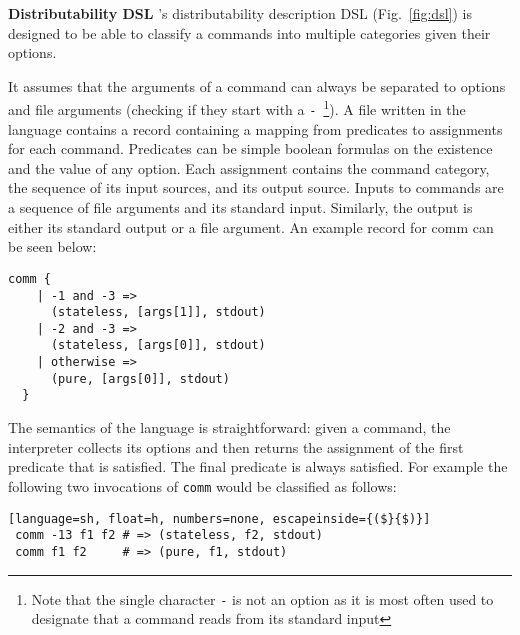 \documentclass[sigplan,10pt,review,anonymous]{acmart}
\newcommand{\heading}[1]{\vspace{4pt}\noindent\textbf{#1}\enspace}
\newcommand{\ttt}[1]{\texttt{\small #1}}
\newcommand{\cn}[1]{\mbox{\textcircled{\footnotesize #1}}}
\newcommand{\pur}{\cn{\textsc{P}}\xspace}
\newcommand{\sta}{\cn{\textsc{S}}\xspace}
\newcommand{\tr}[1]{} %
\begin{document}

\heading{Distributability DSL}
%
\sys's distributability description DSL (Fig.~\ref{fig:dsl}) is
designed to be able to classify a commands into multiple categories
given their options.

It assumes that the arguments of a command can always be separated to
options and file arguments (checking if they start with a
\ttt{-}~\footnote{Note that the single character \ttt{-} is not an
  option as it is most often used to designate that a command reads
  from its standard input}). A file written in the language contains a
record containing a mapping from predicates to assignments for each
command. Predicates can be simple boolean formulas on the existence
and the value of any option. Each assignment contains the command
category, the sequence of its input sources, and its output
source. Inputs to commands are a sequence of file arguments and its
standard input. Similarly, the output is either its standard output or
a file argument. An example record for comm can be seen below:

\begin{lstlisting}[float=h, numbers=none]
  comm {
    | -1 and -3 =>
      (stateless, [args[1]], stdout)
    | -2 and -3 =>
      (stateless, [args[0]], stdout)
    | otherwise =>
      (pure, [args[0]], stdout)
  }
\end{lstlisting}

The semantics of the language is straightforward: given a command, the
interpreter collects its options and then returns the assignment of
the first predicate that is satisfied. The final predicate is always
satisfied. For example the following two invocations of \ttt{comm}
would be classified as follows:

\begin{lstlisting}[language=sh, float=h, numbers=none, escapeinside={($}{$)}]
 comm -13 f1 f2 # => (stateless, f2, stdout)
 comm f1 f2     # => (pure, f1, stdout)
\end{lstlisting}



\tr{We don't need to designate the stderror, because we assume that it
  is never the main output of a command and it will never be used by
  the input of another command in the pipeline. If someone indeed
  wants to do this, they can just use a redirect I think to get around
  it.}
\end{document}
